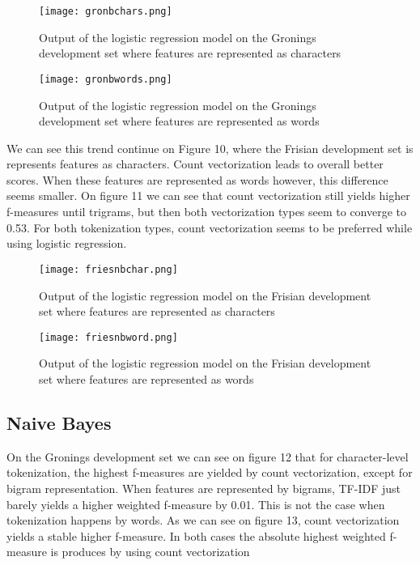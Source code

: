 \documentclass[
10pt, %
a4paper, %
oneside, %
headinclude,footinclude, %
] {book}%
\begin{document}
\begin{figure}[H]
  \texttt{[image: gronbchars.png]}
  \caption{Output of the logistic regression model on the Gronings development set where features are represented as characters}
\end{figure}

\begin{figure}[H]
  \texttt{[image: gronbwords.png]}
  \caption{Output of the logistic regression model on the Gronings development set where features are represented as words}
\end{figure}

We can see this trend continue on Figure 10, where the Frisian development set is represents features as characters. Count vectorization leads to overall better scores. When these features are represented as words however, this difference seems smaller. On figure 11 we can see that count vectorization still yields higher f-measures until trigrams, but then both vectorization types seem to converge to 0.53. For both tokenization types, count vectorization seems to be preferred while using logistic regression.

\begin{figure}[H]
  \texttt{[image: friesnbchar.png]}
  \caption{Output of the logistic regression model on the Frisian development set where features are represented as characters}
\end{figure}

\begin{figure}[H]
  \texttt{[image: friesnbword.png]}
  \caption{Output of the logistic regression model on the Frisian development set where features are represented as words}
\end{figure}

\subsection{Naive Bayes}

On the Gronings development set we can see on figure 12 that for character-level tokenization, the highest f-measures are yielded by count vectorization, except for bigram representation. When features are represented by bigrams, TF-IDF just barely yields a higher weighted f-measure by 0.01. This is not the case when tokenization happens by words. As we can see on figure 13, count vectorization yields a stable higher f-measure. In both cases the absolute highest weighted f-measure is produces by using count vectorization
\end{document}
